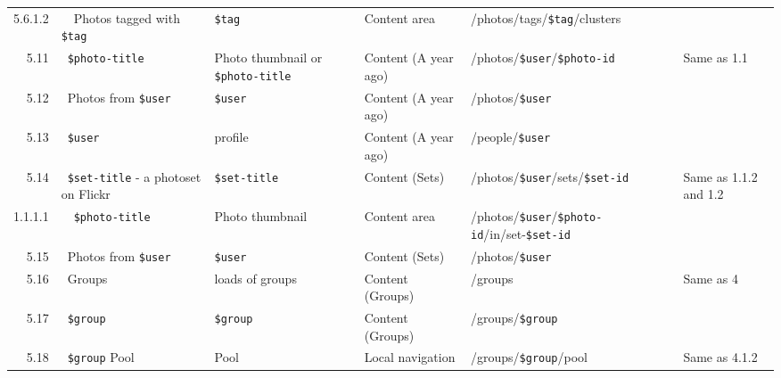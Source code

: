 \documentclass[11pt,a4paper]{article}
\newcommand{\var}[1]{\texttt{\${#1}}}
\begin{document}
\begin{landscape}
\begin{table}[h!b!p!]
\begin{center}
\begin{tiny}
\begin{tabular}{r|l|l|l|l|p{3cm}}
                5.6.1.2 &
                ~~Photos tagged with \var{tag} &
                \var{tag} &
                Content area &
                /photos/tags/\var{tag}/clusters &
                \\

              5.11 &
              ~\var{photo-title} &
              Photo thumbnail or \var{photo-title} &
              Content (A year ago) &
              /photos/\var{user}/\var{photo-id} &
              Same as 1.1 \\

              5.12 &
              ~Photos from \var{user} &
              \var{user} &
              Content (A year ago) &
              /photos/\var{user} &
              \\

              5.13 &
              ~\var{user} &
              profile &
              Content (A year ago) &
              /people/\var{user} &
              \\

              5.14 &
              ~\var{set-title} - a photoset on Flickr &
              \var{set-title} &
              Content (Sets) &
              /photos/\var{user}/sets/\var{set-id} &
              Same as 1.1.2 and 1.2 \\

                1.1.1.1 &
                ~~\var{photo-title} &
                Photo thumbnail &
                Content area &
                /photos/\var{user}/\var{photo-id}/in/set-\var{set-id} &
                \\

              5.15 &
              ~Photos from \var{user} &
              \var{user} &
              Content (Sets) &
              /photos/\var{user} &
              \\

              5.16 &
              ~Groups &
              loads of groups &
              Content (Groups) &
              /groups &
              Same as 4\\

              5.17 &
              ~\var{group} &
              \var{group} &
              Content (Groups) &
              /groups/\var{group} &
              \\

              5.18 &
              ~\var{group} Pool &
              Pool &
              Local navigation &
              /groups/\var{group}/pool &
              Same as 4.1.2 \\


\end{tabular}
\end{tiny}
\end{center}
\end{table}
\end{landscape}
\end{document}

